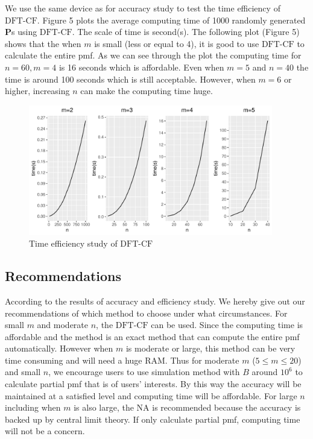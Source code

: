 \documentclass[12pt]{article}
\newcommand{\Pmat}{\mathbf{P}}
\newcommand{\NA}{{\textrm{NA}}}
\newcommand{\dft}{{\textrm{DFT-CF}}}
\begin{document}
We use the same device as for accuracy study to test the time efficiency of $\dft$. Figure 5 plots the average computing time of 1000 randomly generated $\Pmat$s using $\dft$. The scale of time is second(s). The following plot (Figure 5) shows that the when $m$ is small (less or equal to 4), it is good to use $\dft$ to calculate the entire pmf. As we can see through the plot the computing time for $n=60, m=4$ is 16 seconds which is affordable. Even when $m=5$ and $n=40$ the time is around 100 seconds which is still acceptable. However, when $m=6$ or higher, increasing $n$ can make the computing time huge.
\begin{figure}%
	\centering
	\includegraphics[width=0.95\textwidth]{figures/effi.pdf}
	\caption{Time efficiency study of $\dft$}
	\label{fig: dft efficiency}
\end{figure}


\subsection{Recommendations}
According to the results of accuracy and efficiency study. We hereby give out our recommendations of which method to choose under what circumstances. For small $m$ and moderate $n$, the $\dft$ can be used. Since the computing time is affordable and the method is an exact method that can compute the entire pmf automatically. However when $m$ is moderate or large, this method can be very time consuming and will need a huge RAM. Thus for moderate $m$ ($5 \leq m \leq 20$) and small $n$, we encourage users to use simulation method with $B$ around $10^6$ to calculate partial pmf that is of users' interests. By this way the accuracy will be maintained at a satisfied level and computing time will be affordable. For large $n$ including when $m$ is also large, the $\NA$ is recommended because the accuracy is backed up by central limit theory. If only calculate partial pmf, computing time will not be a concern.
\end{document}
